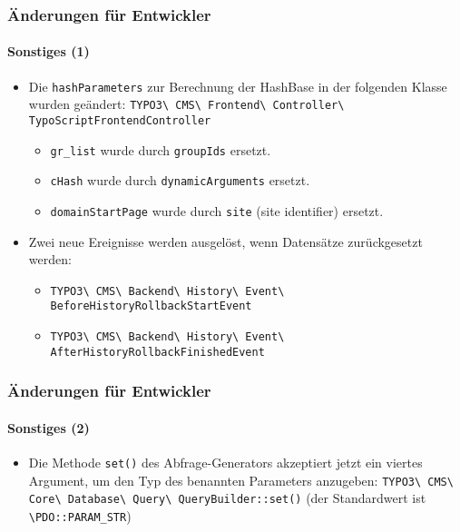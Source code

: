 \begin{frame}[fragile]
	\frametitle{Änderungen für Entwickler}
	\framesubtitle{Sonstiges (1)}

	\begin{itemize}
		\item Die \texttt{hashParameters} zur Berechnung der HashBase in der folgenden Klasse wurden geändert:\newline
			\small
				\texttt{TYPO3\textbackslash
					CMS\textbackslash
					Frontend\textbackslash
					Controller\textbackslash
					TypoScriptFrontendController}
			\normalsize

			\begin{itemize}
				\item \texttt{gr\_list} wurde durch \texttt{groupIds} ersetzt.
				\item \texttt{cHash} wurde durch \texttt{dynamicArguments} ersetzt.
				\item \texttt{domainStartPage} wurde durch \texttt{site} (site identifier) ersetzt.
			\end{itemize}

		\item Zwei neue Ereignisse werden ausgelöst, wenn Datensätze zurückgesetzt werden:

			\begin{itemize}\smaller
				\item \texttt{TYPO3\textbackslash
					CMS\textbackslash
					Backend\textbackslash
					History\textbackslash
					Event\textbackslash
					BeforeHistoryRollbackStartEvent}
				\item \texttt{TYPO3\textbackslash
					CMS\textbackslash
					Backend\textbackslash
					History\textbackslash
					Event\textbackslash
					AfterHistoryRollbackFinishedEvent}
			\end{itemize}\normalsize

	\end{itemize}

\end{frame}


\begin{frame}[fragile]
	\frametitle{Änderungen für Entwickler}
	\framesubtitle{Sonstiges (2)}

	\begin{itemize}
		\item Die Methode \texttt{set()} des Abfrage-Generators akzeptiert jetzt ein viertes Argument,
			um den Typ des benannten Parameters anzugeben:\newline
			\small
				\texttt{TYPO3\textbackslash
					CMS\textbackslash
					Core\textbackslash
					Database\textbackslash
					Query\textbackslash
					QueryBuilder::set()}
			\normalsize\newline
			\vspace{0.2cm}
			(der Standardwert ist \texttt{\textbackslash PDO::PARAM\_STR})

	\end{itemize}

\end{frame}

